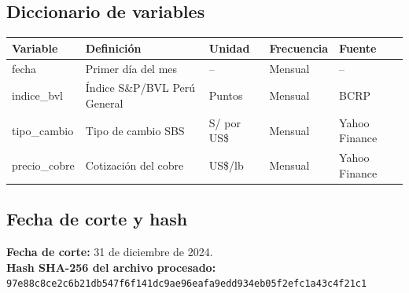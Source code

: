 \documentclass[12pt, a4paper]{article}
\begin{document}
\subsection*{Diccionario de variables}

\begin{table}[H]
\centering
\begin{tabular}{lllll}
\toprule
Variable & Definición & Unidad & Frecuencia & Fuente \\
\midrule
fecha & Primer día del mes & -- & Mensual & -- \\
indice\_bvl & Índice S\&P/BVL Perú General & Puntos & Mensual & BCRP \\
tipo\_cambio & Tipo de cambio SBS & S/ por US\$ & Mensual & Yahoo Finance \\
precio\_cobre & Cotización del cobre & US\$/lb & Mensual & Yahoo Finance \\
\bottomrule
\end{tabular}
\end{table}

\subsection*{Fecha de corte y hash}

\noindent
\textbf{Fecha de corte:} 31 de diciembre de 2024.\\
\noindent
\textbf{Hash SHA-256 del archivo procesado:} \texttt{97e88c8ce2c6b21db547f6f141dc9ae96eafa9edd934eb05f2efc1a43c4f21c1}
\end{document}
